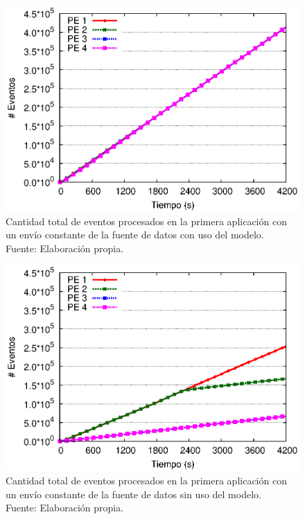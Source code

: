 \begin{figure}[!ht]
	\centering
	\captionsetup{justification=centering}
    \includegraphics[scale=0.7]{images/exp/app1/uniform/cm/eventCount.eps}
    \caption[Cantidad total de eventos procesados en la primera aplicación con un envío constante de la fuente de datos con uso del modelo.]{Cantidad total de eventos procesados en la primera aplicación con un envío constante de la fuente de datos con uso del modelo.\\Fuente: Elaboración propia.}
    \label{fig:app1-uniform-eventCount-cm}
\end{figure}

\begin{figure}[!ht]
	\centering
	\captionsetup{justification=centering}
    \includegraphics[scale=0.7]{images/exp/app1/uniform/sm/eventCount.eps}
    \caption[Cantidad total de eventos procesados en la primera aplicación con un envío constante de la fuente de datos sin uso del modelo.]{Cantidad total de eventos procesados en la primera aplicación con un envío constante de la fuente de datos sin uso del modelo.\\Fuente: Elaboración propia.}
    \label{fig:app1-uniform-eventCount-sm}
\end{figure}

